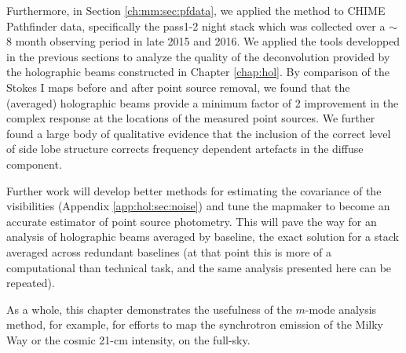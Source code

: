 Furthermore, in Section \ref{ch:mm:sec:pfdata}, we applied the method to CHIME Pathfinder data, specifically the pass1-2 night stack which was collected over a $\sim$8 month observing period in late 2015 and 2016. We applied the tools developped in the previous sections to analyze the quality of the deconvolution provided by the holographic beams constructed in Chapter \ref{chap:hol}. By comparison of the Stokes I maps before and after point source removal, we found that the (averaged) holographic beams provide a minimum factor of 2 improvement in the complex response at the locations of the measured point sources. We further found a large body of qualitative evidence that the inclusion of the correct level of side lobe structure corrects frequency dependent artefacts in the diffuse component.

Further work will develop better methods for estimating the covariance of the visibilities (Appendix \ref{app:hol:sec:noise}) and tune the mapmaker to become an accurate estimator of point source photometry. This will pave the way for an analysis of holographic beams averaged by baseline, the exact solution for a stack averaged across redundant baselines (at that point this is more of a computational than technical task, and the same analysis presented here can be repeated).

As a whole, this chapter demonstrates the usefulness of the $m$-mode analysis method, for example, for efforts to map the synchrotron emission of the Milky Way \cite{eastwoodetal} or the cosmic 21-cm intensity, on the full-sky.





